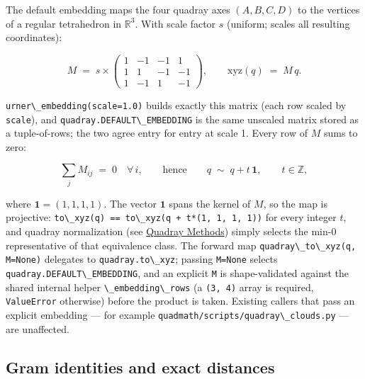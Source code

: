 \documentclass[
  10pt,
]{article}
\newcommand{\passthrough}[1]{#1}
\begin{document}
The default embedding maps the four quadray axes \((A, B, C, D)\) to the
vertices of a regular tetrahedron in \(\mathbb{R}^3\). With scale factor
\(s\) (uniform; scales all resulting coordinates):

\begin{equation}
\label{eq:conv-embedding}
M \;=\; s \times
\begin{pmatrix}
 1 & -1 & -1 &  1 \\
 1 &  1 & -1 & -1 \\
 1 & -1 &  1 & -1
\end{pmatrix},
\qquad \mathrm{xyz}(q) \;=\; M\,q .
\end{equation}

\passthrough{\lstinline!urner\_embedding(scale=1.0)!} builds exactly
this matrix (each row scaled by \passthrough{\lstinline!scale!}), and
\passthrough{\lstinline!quadray.DEFAULT\_EMBEDDING!} is the same
unscaled matrix stored as a tuple-of-rows; the two agree entry for entry
at scale 1. Every row of \(M\) sums to zero:

\begin{equation}
\label{eq:conv-fiber}
\textstyle\sum_{j} M_{ij} \;=\; 0 \quad \forall\, i,
\qquad \text{hence} \qquad
q \;\sim\; q + t\,\mathbf{1}, \qquad t \in \mathbb{Z},
\end{equation}

where \(\mathbf{1} = (1, 1, 1, 1)\). The vector \(\mathbf{1}\) spans the
kernel of \(M\), so the map is projective:
\passthrough{\lstinline!to\_xyz(q) == to\_xyz(q + t*(1, 1, 1, 1))!} for
every integer \(t\), and quadray normalization (see
\href{03_quadray_methods.md}{Quadray Methods}) simply selects the min-0
representative of that equivalence class. The forward map
\passthrough{\lstinline!quadray\_to\_xyz(q, M=None)!} delegates to
\passthrough{\lstinline!quadray.to\_xyz!}; passing
\passthrough{\lstinline!M=None!} selects
\passthrough{\lstinline!quadray.DEFAULT\_EMBEDDING!}, and an explicit
\passthrough{\lstinline!M!} is shape-validated against the shared
internal helper \passthrough{\lstinline!\_embedding\_rows!} (a
\passthrough{\lstinline!(3, 4)!} array is required,
\passthrough{\lstinline!ValueError!} otherwise) before the product is
taken. Existing callers that pass an explicit embedding --- for example
\passthrough{\lstinline!quadmath/scripts/quadray\_clouds.py!} --- are
unaffected.

\subsection{Gram identities and exact
distances}\label{gram-identities-and-exact-distances}
\end{document}
